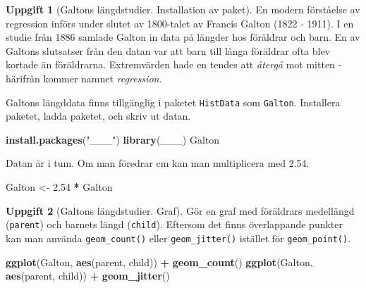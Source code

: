 \documentclass[
]{book}
\newenvironment{Shaded}{\begin{snugshade}}{\end{snugshade}}
\newcommand{\FloatTok}[1]{\textcolor[rgb]{0.00,0.00,0.81}{#1}}
\newcommand{\FunctionTok}[1]{\textcolor[rgb]{0.13,0.29,0.53}{\textbf{#1}}}
\newcommand{\NormalTok}[1]{#1}
\newcommand{\OtherTok}[1]{\textcolor[rgb]{0.56,0.35,0.01}{#1}}
\newcommand{\SpecialCharTok}[1]{\textcolor[rgb]{0.81,0.36,0.00}{\textbf{#1}}}
\newcommand{\StringTok}[1]{\textcolor[rgb]{0.31,0.60,0.02}{#1}}
\theoremstyle{definition}
\theoremstyle{definition}
\theoremstyle{definition}
\newtheorem{exercise}{Uppgift}[chapter]
\theoremstyle{definition}
\theoremstyle{remark}
\begin{document}
\begin{exercise}[Galtons längdstudier. Installation av paket]

En modern förståelse av regression införs under slutet av 1800-talet av Francis Galton (1822 - 1911). I en studie från 1886 samlade Galton in data på längder hos föräldrar och barn. En av Galtons slutsatser från den datan var att barn till långa föräldrar ofta blev kortade än föräldrarna. Extremvärden hade en tendes att \emph{återgå} mot mitten - härifrån kommer namnet \emph{regression}.

Galtons längddata finns tillgänglig i paketet \texttt{HistData} som \texttt{Galton}. Installera paketet, ladda paketet, och skriv ut datan.

\begin{Shaded}
\begin{Highlighting}[]
\FunctionTok{install.packages}\NormalTok{(}\StringTok{"\_\_\_"}\NormalTok{)}
\FunctionTok{library}\NormalTok{(\_\_\_)}
\NormalTok{Galton}
\end{Highlighting}
\end{Shaded}

Datan är i tum. Om man föredrar cm kan man multiplicera med 2.54.

\begin{Shaded}
\begin{Highlighting}[]
\NormalTok{Galton }\OtherTok{\textless{}{-}} \FloatTok{2.54} \SpecialCharTok{*}\NormalTok{ Galton}
\end{Highlighting}
\end{Shaded}

\end{exercise}

\begin{exercise}[Galtons längdstudier. Graf]

Gör en graf med föräldrars medellängd (\texttt{parent}) och barnets längd (\texttt{child}). Eftersom det finns överlappande punkter kan man använda \texttt{geom\_count()} eller \texttt{geom\_jitter()} istället för \texttt{geom\_point()}.

\begin{Shaded}
\begin{Highlighting}[]
\FunctionTok{ggplot}\NormalTok{(Galton, }\FunctionTok{aes}\NormalTok{(parent, child)) }\SpecialCharTok{+} \FunctionTok{geom\_count}\NormalTok{()}
\FunctionTok{ggplot}\NormalTok{(Galton, }\FunctionTok{aes}\NormalTok{(parent, child)) }\SpecialCharTok{+} \FunctionTok{geom\_jitter}\NormalTok{()}
\end{Highlighting}
\end{Shaded}

\end{exercise}
\end{document}
